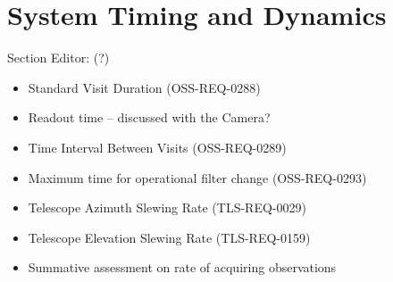 \section{System Timing and Dynamics}
\label{sec:dynamics}

Section Editor: (?)

\begin{itemize}
    \item Standard Visit Duration (OSS-REQ-0288)
    \item Readout time – discussed with the Camera?
    \item Time Interval Between Visits (OSS-REQ-0289)
    \item Maximum time for operational filter change (OSS-REQ-0293)
    \item Telescope Azimuth Slewing Rate (TLS-REQ-0029)
    \item Telescope Elevation Slewing Rate (TLS-REQ-0159)
    \item Summative assessment on rate of acquiring observations
\end{itemize}